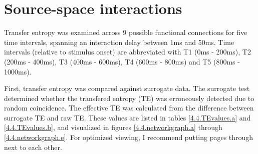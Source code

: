 \section{Source-space interactions}

Transfer entropy was examined across 9 possible functional connections for five time intervals, spanning an interaction delay between 1ms and 50ms.
Time intervals (relative to stimulus onset) are abbreviated with T1 (0ms - 200ms), T2 (200ms - 400ms), T3 (400ms - 600ms), T4 (600ms - 800ms) and T5 (800ms - 1000ms).

First, transfer entropy was compared against surrogate data.
The surrogate test determined whether the transfered entropy (TE) was erroneously detected due to random coincidence.
The effective TE was calculated from the difference between surrogate TE and raw TE.
These values are listed in tables \ref{4.4.TEvalues.a} and \ref{4.4.TEvalues.b}, and visualized in figures \ref{4.4.networkgraph.a} through \ref{4.4.networkgraph.e}. For optimized viewing, I recommend putting pages \pageref{4.4.networkgraph.a} through \pageref{4.4.networkgraph.e} next to each other. 

